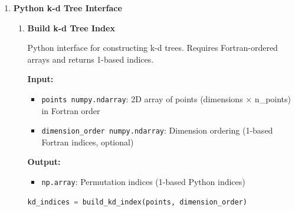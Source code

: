 \documentclass[11pt]{article}
\begin{document}
\begin{enumerate}
\begin{enumerate}
\begin{itemize}
	      	      	\item \texttt{upper\_bound float}: Upper bound of range (inclusive)
	      	      \end{itemize}
	      	      \textbf{Output:}
	      	      \begin{itemize}
	      	      	\item \texttt{Dictionary}: (matching\_indices, count) where indices
	      	      	      are 1-based
	      	      \end{itemize}
	      	      \begin{lstlisting}[language=Python]
# + 1 is added because of 0-based indexing. If the indices are already 1 based, this is not necessary
res = bst_range_query(values, indices + 1, lower_bound, upper_bound)
	      	      \end{lstlisting}
	      	      
	      	\item \textbf{Get Sorted Value}
	      	      
	      	      \textbf{Note:} This function is not implemented as a separate Python
	      	      function. Use direct array indexing instead:
	      	      \begin{lstlisting}[language=Python]
value = values[indices[position]]  # position is 1-based
	      	      \end{lstlisting}
	      \end{enumerate}
	      
	\item \textbf{Python k-d Tree Interface}
	      
	      \begin{enumerate}
	      	\item \textbf{Build k-d Tree Index}
	      	      
	      	      Python interface for constructing k-d trees. Requires Fortran-ordered
	      	      arrays and returns 1-based indices.
	      	      
	      	      \textbf{Input:}
	      	      \begin{itemize}
	      	      	\item \texttt{points numpy.ndarray}: 2D array of points (dimensions
	      	      	      × n\_points) in Fortran order
	      	      	      
	      	      	\item \texttt{dimension\_order numpy.ndarray}: Dimension ordering (1-based
	      	      	      Fortran indices, optional)
	      	      \end{itemize}
	      	      \textbf{Output:}
	      	      \begin{itemize}
	      	      	\item \texttt{np.array}: Permutation indices (1-based Python indices)
	      	      \end{itemize}
	      	      \begin{lstlisting}[language=Python]
kd_indices = build_kd_index(points, dimension_order)
	      	      \end{lstlisting}
	      	      

\end{enumerate}
\end{enumerate}
\end{document}
